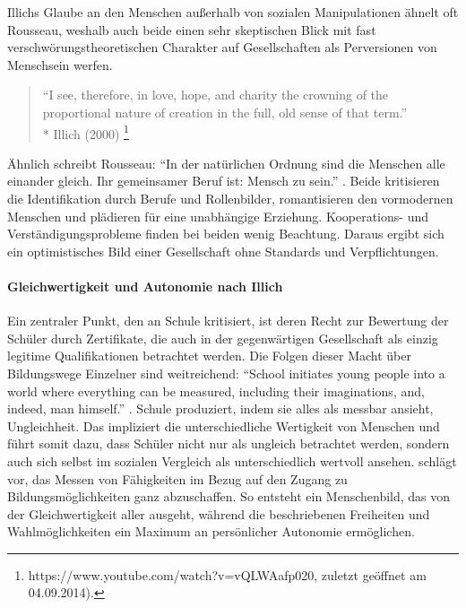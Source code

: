 Illichs Glaube an den Menschen außerhalb von sozialen Manipulationen ähnelt oft Rousseau, weshalb auch beide einen sehr skeptischen Blick mit fast verschwörungstheoretischen Charakter auf Gesellschaften als Perversionen von Menschsein werfen.

\begin{quote}
	``I see, therefore, in love, hope, and charity the crowning of the proportional nature of creation in the full, old sense of that term.''\\*
	Illich (2000)
	\footnote{
		https://www.youtube.com/watch?v=vQLWAafp020, zuletzt geöffnet am 04.09.2014).
	}
\end{quote}

Ähnlich schreibt Rousseau: ``In der natürlichen Ordnung sind die Menschen alle einander gleich. Ihr gemeinsamer Beruf ist: Mensch zu sein.'' \parencite[50]{rousseau-1762}.
Beide kritisieren die Identifikation durch Berufe und Rollenbilder, romantisieren den vormodernen Menschen und plädieren für eine unabhängige Erziehung.
Kooperations- und Verständigungsprobleme finden bei beiden wenig Beachtung.
Daraus ergibt sich ein optimistisches Bild einer Gesellschaft ohne Standards und Verpflichtungen.


\paragraph{Gleichwertigkeit und Autonomie nach Illich}

Ein zentraler Punkt, den \citeauthor{Illich-1971} an Schule kritisiert, ist deren Recht zur Bewertung der Schüler durch Zertifikate, die auch in der gegenwärtigen Gesellschaft als einzig legitime Qualifikationen betrachtet werden.
Die Folgen dieser Macht über Bildungswege Einzelner sind weitreichend: ``School initiates young people into a world where everything can be measured, including their imaginations, and, indeed, man himself.'' \parencite[19]{Illich-1971}.
Schule produziert, indem sie alles als messbar ansieht, Ungleichheit.
Das impliziert die unterschiedliche Wertigkeit von Menschen und führt somit dazu, dass Schüler nicht nur als ungleich betrachtet werden, sondern auch sich selbst im sozialen Vergleich als unterschiedlich wertvoll ansehen.
\citeauthor{Illich-1971} schlägt vor, das Messen von Fähigkeiten im Bezug auf den Zugang zu Bildungsmöglichkeiten ganz abzuschaffen.
So entsteht ein Menschenbild, das von der Gleichwertigkeit aller ausgeht, während die beschriebenen Freiheiten und Wahlmöglichkeiten ein Maximum an persönlicher Autonomie ermöglichen.
